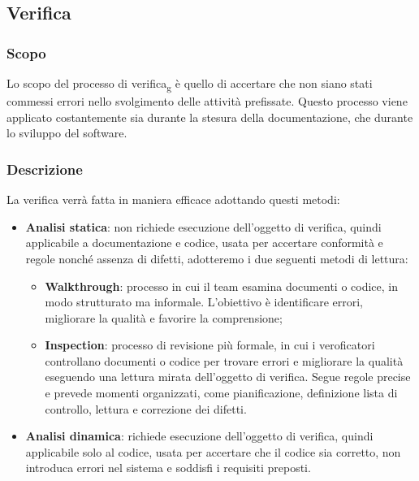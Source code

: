 \subsection{Verifica}
\subsubsection{Scopo}
Lo scopo del processo di verifica\textsubscript{g} è quello di accertare che
non siano stati commessi errori nello svolgimento delle attività prefissate.
Questo processo viene applicato costantemente sia durante la stesura della
documentazione, che durante lo sviluppo del software.
\subsubsection{Descrizione}
La verifica verrà fatta in maniera efficace adottando questi metodi:
\begin{itemize}
      \item \textbf{Analisi statica}: non richiede esecuzione dell'oggetto di verifica, quindi applicabile a documentazione e codice, usata per accertare conformità e regole nonché assenza di difetti, adotteremo i due seguenti metodi di lettura:
            \begin{itemize}
                  \item \textbf{Walkthrough}: processo in cui il team esamina documenti o codice, in modo strutturato ma informale. L'obiettivo è identificare errori, migliorare la qualità e favorire la comprensione;
                  \item \textbf{Inspection}: processo di revisione più formale, in cui i veroficatori controllano documenti o codice per trovare errori e migliorare la qualità eseguendo una lettura mirata dell'oggetto di verifica. Segue regole precise e prevede momenti organizzati, come pianificazione, definizione lista di controllo, lettura e correzione dei difetti.
            \end{itemize}
      \item \textbf{Analisi dinamica}: richiede esecuzione dell'oggetto di verifica, quindi applicabile solo al codice, usata per accertare che il codice sia corretto, non introduca errori nel sistema e soddisfi i requisiti preposti.
\end{itemize}
